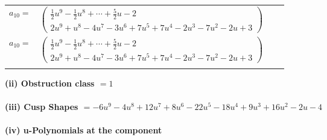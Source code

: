 \documentclass[1p]{elsarticle_modified}
\theoremstyle{definition}
\begin{document}
\begin{tabular}{m{7pt} m{180pt} m{7pt} m{180pt} }
\flushright $a_{10}=$&$\begin{pmatrix}\frac{1}{2} u^9-\frac{1}{2} u^8+\cdots+\frac{5}{2} u-2\\2 u^9+u^8-4 u^7-3 u^6+7 u^5+7 u^4-2 u^3-7 u^2-2 u+3\end{pmatrix}$\\ \flushright $a_{10}=$&$\begin{pmatrix}\frac{1}{2} u^9-\frac{1}{2} u^8+\cdots+\frac{5}{2} u-2\\2 u^9+u^8-4 u^7-3 u^6+7 u^5+7 u^4-2 u^3-7 u^2-2 u+3\end{pmatrix}$\\&\end{tabular}
\flushleft \textbf{(ii) Obstruction class $= 1$}\\~\\
\flushleft \textbf{(iii) Cusp Shapes $= -6 u^9-4 u^8+12 u^7+8 u^6-22 u^5-18 u^4+9 u^3+16 u^2-2 u-4$}\\~\\
\newpage\renewcommand{\arraystretch}{1}
\flushleft \textbf{(iv) u-Polynomials at the component}\newline \\
\end{document}
